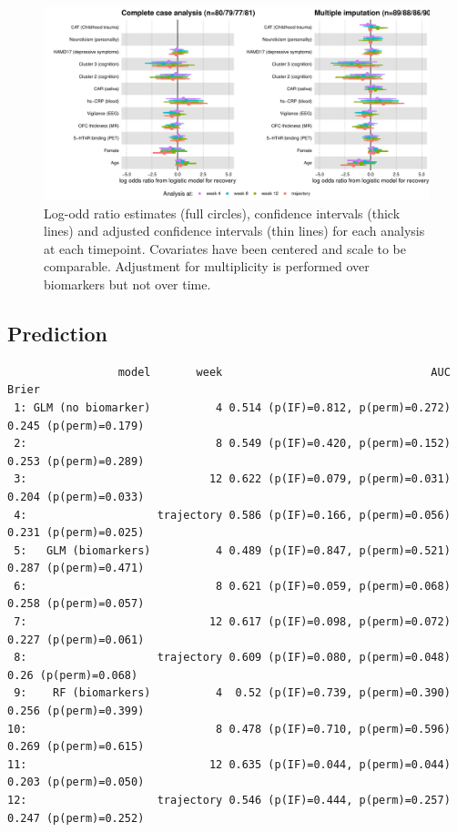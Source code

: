 \documentclass[12pt]{article}
\begin{document}
\begin{figure}[!h]
\centering
\includegraphics[trim={0 0 0 0},width=\textwidth]{./../figures/gg-forestplot-OR-traj.pdf}
\caption{Log-odd ratio estimates (full circles), confidence intervals (thick lines) and adjusted confidence intervals (thin lines) for each analysis at each timepoint. Covariates have been centered and scale to be comparable. Adjustment for multiplicity is performed over biomarkers but not over time.}
\end{figure}

\clearpage
\subsection{Prediction}
\label{sec:orgeb1046b}

\label{}
\begin{verbatim}
                 model       week                                AUC                 Brier
 1: GLM (no biomarker)          4 0.514 (p(IF)=0.812, p(perm)=0.272) 0.245 (p(perm)=0.179)
 2:                             8 0.549 (p(IF)=0.420, p(perm)=0.152) 0.253 (p(perm)=0.289)
 3:                            12 0.622 (p(IF)=0.079, p(perm)=0.031) 0.204 (p(perm)=0.033)
 4:                    trajectory 0.586 (p(IF)=0.166, p(perm)=0.056) 0.231 (p(perm)=0.025)
 5:   GLM (biomarkers)          4 0.489 (p(IF)=0.847, p(perm)=0.521) 0.287 (p(perm)=0.471)
 6:                             8 0.621 (p(IF)=0.059, p(perm)=0.068) 0.258 (p(perm)=0.057)
 7:                            12 0.617 (p(IF)=0.098, p(perm)=0.072) 0.227 (p(perm)=0.061)
 8:                    trajectory 0.609 (p(IF)=0.080, p(perm)=0.048)  0.26 (p(perm)=0.068)
 9:    RF (biomarkers)          4  0.52 (p(IF)=0.739, p(perm)=0.390) 0.256 (p(perm)=0.399)
10:                             8 0.478 (p(IF)=0.710, p(perm)=0.596) 0.269 (p(perm)=0.615)
11:                            12 0.635 (p(IF)=0.044, p(perm)=0.044) 0.203 (p(perm)=0.050)
12:                    trajectory 0.546 (p(IF)=0.444, p(perm)=0.257) 0.247 (p(perm)=0.252)
\end{verbatim}
\end{document}
